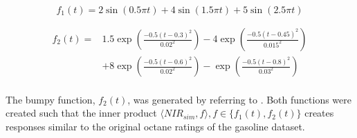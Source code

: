 \documentclass[11pt,twoside,a4paper]{article}
\begin{document}
	\begin{equation}
    	f_1(t) = 2\sin(0.5\pi t) + 4\sin(1.5 \pi t) + 5\sin(2.5 \pi t) 
    \end{equation}

    \begin{equation}
    	\begin{split}
    		f_2(t) = & 1.5 \exp{\left(\frac{-0.5(t-0.3)^2}{0.02^2}\right)} - 4 \exp{\left(\frac{-0.5(t-0.45)^2}{0.015^2}\right)} \\
    				 & + 8 \exp{\left(\frac{-0.5(t-0.6)^2}{0.02^2}\right)} -  \exp{\left(\frac{-0.5(t-0.8)^2}{0.03^2}\right)}
    	\end{split}
    \end{equation}
    \vspace{0.2cm}\\
    
    The bumpy function, $f_2(t)$, was generated by referring to \cite{cardot_bumpyfunction_2002}. 
    Both functions were created such that the inner product $\langle NIR_{sim}, f \rangle, f \in \{f_1(t), f_2(t)\}$ creates responses similar to the original octane ratings of the gasoline dataset. 
\end{document}
